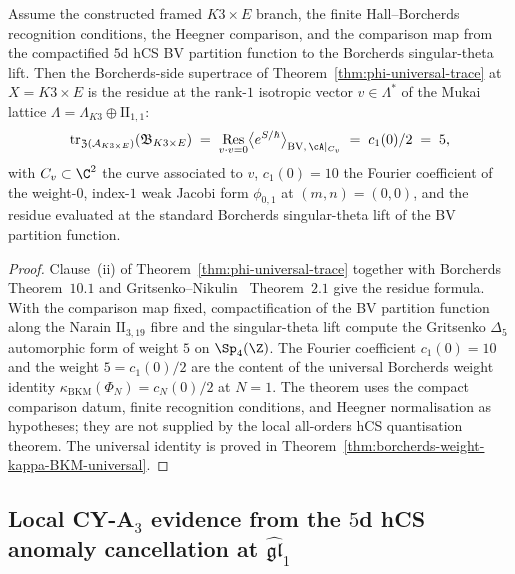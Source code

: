 \begin{theorem}
\label{thm:phiutp-borcherds-residue-k3e}
Assume the constructed framed \(K3\times E\) branch, the finite
Hall--Borcherds recognition conditions, the Heegner comparison, and the
comparison map from the compactified \(5\)d hCS BV partition function to
the Borcherds singular-theta lift. Then the Borcherds-side supertrace of
Theorem~\ref{thm:phi-universal-trace} at $X = K3\times E$ is the
residue at the rank-$1$ isotropic vector $v\in\Lambda^*$ of the Mukai
lattice $\Lambda = \Lambda_{K3}\oplus \mathrm{II}_{1,1}$:
\[
 \mathrm{tr}_{\mathfrak{Z}(\mathcal{A}_{K3\times E})}(\mathfrak{B}_{K3\times E})
 \;=\; \operatorname*{Res}_{v\cdot v = 0}
 \bigl\langle e^{S/\hbar}\bigr\rangle_{\mathrm{BV},\, \cA|_{C_v}}
 \;=\; c_1(0)/2 \;=\; 5,
\]
with $C_v\subset\C^2$ the curve associated to $v$, $c_1(0) = 10$ the
Fourier coefficient of the weight-$0$, index-$1$ weak Jacobi form
$\phi_{0,1}$ at
$(m, n) = (0, 0)$, and the residue evaluated at the standard
Borcherds singular-theta lift of the BV partition function.
\end{theorem}

\begin{proof}
Clause~(ii) of Theorem~\ref{thm:phi-universal-trace} together with
Borcherds~\cite{Borcherds1998} Theorem~$10.1$ and
Gritsenko--Nikulin~\cite{GritsenkoNikulin1997} Theorem~$2.1$ give the
residue formula. With the comparison map fixed, compactification of the
BV partition function along the Narain $\mathrm{II}_{3,19}$ fibre and
the singular-theta lift compute the Gritsenko $\Delta_5$ automorphic
form of weight $5$ on $\Sp_4(\Z)$. The Fourier coefficient
$c_1(0) = 10$ and the weight $5 = c_1(0)/2$ are the content of the
universal Borcherds weight identity
$\kappa_{\mathrm{BKM}}(\Phi_N) = c_N(0)/2$ at $N = 1$. The theorem uses
the compact comparison datum, finite recognition conditions, and Heegner
normalisation as hypotheses; they are not supplied by the local
all-orders hCS quantisation theorem.
The universal identity is proved in
Theorem~\ref{thm:borcherds-weight-kappa-BKM-universal}.
\end{proof}

\subsection{Local CY-A\texorpdfstring{$_3$}{3} evidence from the \texorpdfstring{$5$}{5}d hCS anomaly cancellation at \texorpdfstring{$\widehat{\mathfrak{gl}}_1$}{affine-gl1}}
\label{subsec:phiutp-cya3-anomaly-cancellation}

